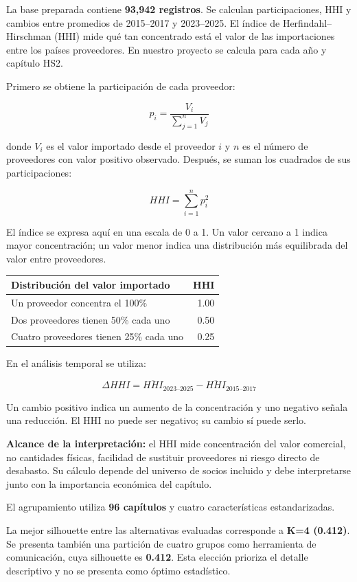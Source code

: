 \documentclass[
  spanish,
  10pt,
]{article}
\newcounter{none} %
\begin{document}
La base preparada contiene \textbf{93,942 registros}. Se calculan
participaciones, HHI y cambios entre promedios de 2015--2017 y
2023--2025. El índice de Herfindahl--Hirschman (HHI) mide qué tan
concentrado está el valor de las importaciones entre los países
proveedores. En nuestro proyecto se calcula para cada año y capítulo
HS2.

Primero se obtiene la participación de cada proveedor:

\[
p_i = \frac{V_i}{\sum_{j=1}^{n} V_j}
\]

donde \(V_i\) es el valor importado desde el proveedor \(i\) y \(n\) es
el número de proveedores con valor positivo observado. Después, se suman
los cuadrados de sus participaciones:

\[
HHI = \sum_{i=1}^{n} p_i^2
\]

El índice se expresa aquí en una escala de 0 a 1. Un valor cercano a 1
indica mayor concentración; un valor menor indica una distribución más
equilibrada del valor entre proveedores.

{\def\LTcaptype{none} %
\begin{longtable}[]{@{}lr@{}}
\toprule\noalign{}
Distribución del valor importado & HHI \\
\midrule\noalign{}
\endhead
\bottomrule\noalign{}
\endlastfoot
Un proveedor concentra el 100\% & 1.00 \\
Dos proveedores tienen 50\% cada uno & 0.50 \\
Cuatro proveedores tienen 25\% cada uno & 0.25 \\
\end{longtable}
}

En el análisis temporal se utiliza:

\[
\Delta HHI =
\overline{HHI}_{2023–2025} -
\overline{HHI}_{2015–2017}
\]

Un cambio positivo indica un aumento de la concentración y uno negativo
señala una reducción. El HHI no puede ser negativo; su cambio sí puede
serlo.

\textbf{Alcance de la interpretación:} el HHI mide concentración del
valor comercial, no cantidades físicas, facilidad de sustituir
proveedores ni riesgo directo de desabasto. Su cálculo depende del
universo de socios incluido y debe interpretarse junto con la
importancia económica del capítulo.

El agrupamiento utiliza \textbf{96 capítulos} y cuatro características
estandarizadas.

La mejor silhouette entre las alternativas evaluadas corresponde a
\textbf{K=4 (0.412)}. Se presenta también una partición de cuatro grupos
como herramienta de comunicación, cuya silhouette es \textbf{0.412}.
Esta elección prioriza el detalle descriptivo y no se presenta como
óptimo estadístico.
\end{document}
